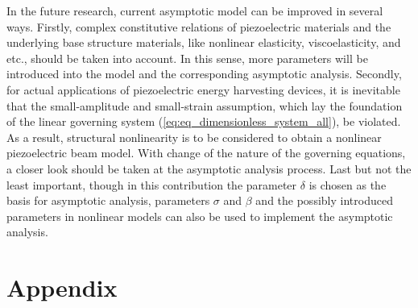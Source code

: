 \documentclass{svjour3}                     %
\begin{document}
In the future research, current asymptotic model can be improved in several ways. Firstly, complex constitutive relations of piezoelectric materials and the underlying base structure materials, like nonlinear elasticity, viscoelasticity, and etc., should be taken into account. In this sense, more parameters will be introduced into the model and the corresponding asymptotic analysis. Secondly, for actual applications of piezoelectric energy harvesting devices, it is inevitable that the small-amplitude and small-strain assumption, which lay the foundation of the linear governing system (\ref{eq:eq_dimensionless_system_all}), be violated. As a result, structural nonlinearity is to be considered to obtain a nonlinear piezoelectric beam model. With change of the nature of the governing equations, a closer look should be taken at the asymptotic analysis process. Last but not the least important, though in this contribution the parameter $\delta$ is chosen as the basis for asymptotic analysis, parameters $\sigma$ and $\beta$ and the possibly introduced parameters in nonlinear models can also be used to implement the asymptotic analysis. 




\section*{Appendix}
\label{sec:sec_appendix}
\end{document}

